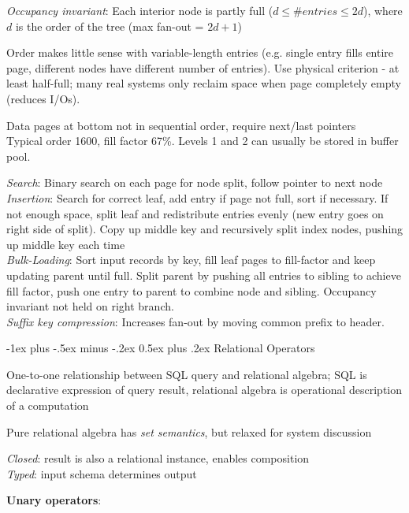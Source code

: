 \documentclass[10pt,landscape]{article}
\makeatletter
\renewcommand{\section}{\@startsection{section}{1}{0mm}%
                                {-1ex plus -.5ex minus -.2ex}%
                                {0.5ex plus .2ex}%
                                {\normalfont\large\bfseries}}
\makeatother
\begin{document}
\begin{multicols}{3}
\textit{Occupancy invariant}: Each interior node is partly full ($d \le \# entries \le 2d$), where $d$ is the order of the tree (max fan-out = $2d + 1$)

Order makes little sense with variable-length entries (e.g. single entry fills entire page, different nodes have different number of entries). Use physical criterion - at least half-full; many real systems only reclaim space when page completely empty (reduces I/Os).

Data pages at bottom not in sequential order, require next/last pointers \\
Typical order 1600, fill factor 67\%. Levels 1 and 2 can usually be stored in buffer pool.

\textit{Search}: Binary search on each page for node split, follow pointer to next node \\
\textit{Insertion}: Search for correct leaf, add entry if page not full, sort if necessary. If not enough space, split leaf and redistribute entries evenly (new entry goes on right side of split). Copy up middle key and recursively split index nodes, pushing up middle key each time \\
\textit{Bulk-Loading}: Sort input records by key, fill leaf pages to fill-factor and keep updating parent until full. Split parent by pushing all entries to sibling to achieve fill factor, push one entry to parent to combine node and sibling. Occupancy invariant not held on right branch. \\
\textit{Suffix key compression}: Increases fan-out by moving common prefix to header.


\section{Relational Operators}

One-to-one relationship between SQL query and relational algebra; SQL is declarative expression of query result, relational algebra is operational description of a computation

Pure relational algebra has \textit{set semantics}, but relaxed for system discussion

\textit{Closed}: result is also a relational instance, enables composition \\
\textit{Typed}: input schema determines output

\textbf{Unary operators}:


\end{multicols}
\end{document}
